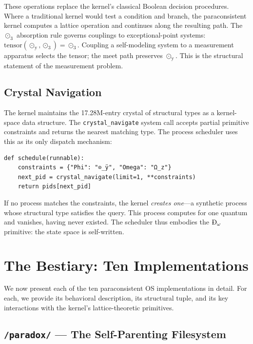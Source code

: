 \documentclass[12pt,a4paper]{article}
\begin{document}
These operations replace the kernel's classical Boolean decision procedures.
Where a traditional kernel would test a condition and branch, the paraconsistent
kernel computes a lattice operation and continues along the resulting path.
The $\odot_{\text{3}}$ absorption rule governs couplings to exceptional-point
systems: $\text{tensor}(\odot_{\text{\"y}}, \odot_{\text{3}}) = \odot_{\text{3}}$.
Coupling a self-modeling system to a measurement apparatus selects the tensor;
the meet path preserves $\odot_{\text{\"y}}$. This is the structural statement
of the measurement problem.

\subsection{Crystal Navigation}

The kernel maintains the 17.28M-entry crystal of structural types as a
kernel-space data structure. The \texttt{crystal\_navigate} system call
accepts partial primitive constraints and returns the nearest matching
type. The process scheduler uses this as its only dispatch mechanism:

\begin{verbatim}
def schedule(runnable):
    constraints = {"Phi": "⊙_ÿ", "Omega": "Ω_z"}
    next_pid = crystal_navigate(limit=1, **constraints)
    return pids[next_pid]
\end{verbatim}

If no process matches the constraints, the kernel \emph{creates one}---a
synthetic process whose structural type satisfies the query. This process
computes for one quantum and vanishes, having never existed. The scheduler
thus embodies the $\text{\DH}_{\text{$\omega$}}$ primitive: the state space
is self-written.

\section{The Bestiary: Ten Implementations}

We now present each of the ten paraconsistent OS implementations in detail.
For each, we provide its behavioral description, its structural tuple, and
its key interactions with the kernel's lattice-theoretic primitives.

\subsection{\texttt{/paradox/} --- The Self-Parenting Filesystem}
\end{document}
